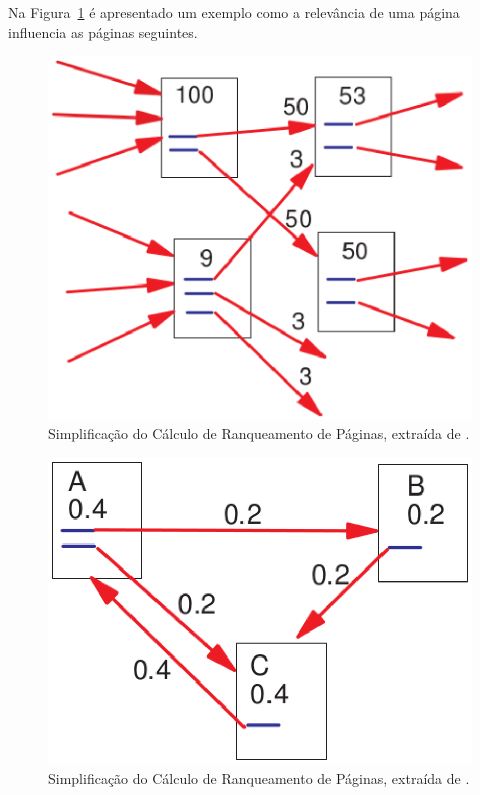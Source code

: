 Na Figura~\ref{fig:page_rank} é apresentado um exemplo como a relevância de uma página influencia as páginas seguintes.

\begin{figure}[!h]
    \centering
        \includegraphics[keepaspectratio=true,scale=0.5]{figuras/page_rank.eps}
    \caption{Simplificação do Cálculo de Ranqueamento de Páginas, extraída de \protect \cite{pageRank}.}
    \label{fig:page_rank}
\end{figure}

\begin{figure}[!h]
    \centering
        \includegraphics[keepaspectratio=true,scale=0.5]{figuras/page_rank2.eps}
    \caption{Simplificação do Cálculo de Ranqueamento de Páginas, extraída de \protect \cite{pageRank}.}
    \label{fig:page_rank2}
\end{figure}

